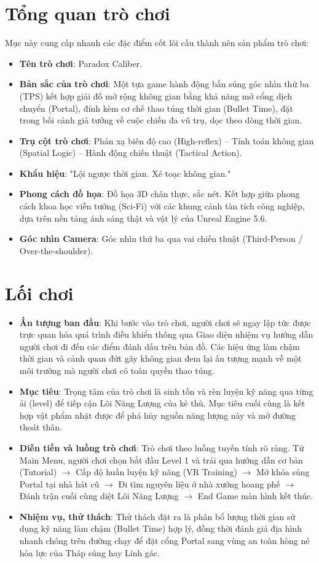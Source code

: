 \documentclass[../DoAn.tex]{subfiles}
\begin{document}
\section{Tổng quan trò chơi}
Mục này cung cấp nhanh các đặc điểm cốt lõi cấu thành nên sản phẩm trò chơi:
\begin{itemize}
    \item \textbf{Tên trò chơi}: Paradox Caliber.
    \item \textbf{Bản sắc của trò chơi}: Một tựa game hành động bắn súng góc nhìn thứ ba (TPS) kết hợp giải đố mở rộng không gian bằng khả năng mở cổng dịch chuyển (Portal), đính kèm cơ chế thao túng thời gian (Bullet Time), đặt trong bối cảnh giả tưởng về cuộc chiến đa vũ trụ, dọc theo dòng thời gian.
    \item \textbf{Trụ cột trò chơi}: Phản xạ biên độ cao (High-reflex) -- Tính toán không gian (Spatial Logic) -- Hành động chiến thuật (Tactical Action).
    \item \textbf{Khẩu hiệu}: "Lội ngược thời gian. Xé toạc không gian."
    \item \textbf{Phong cách đồ họa}: Đồ họa 3D chân thực, sắc nét. Kết hợp giữa phong cách khoa học viễn tưởng (Sci-Fi) với các khung cảnh tàn tích công nghiệp, dựa trên nền tảng ánh sáng thật và vật lý của Unreal Engine 5.6.
    \item \textbf{Góc nhìn Camera}: Góc nhìn thứ ba qua vai chiến thuật (Third-Person / Over-the-shoulder).
\end{itemize}

\section{Lối chơi}
\begin{itemize}
    \item \textbf{Ấn tượng ban đầu}: Khi bước vào trò chơi, người chơi sẽ ngay lập tức được trực quan hóa quá trình điều khiển thông qua Giao diện nhiệm vụ hướng dẫn người chơi đi đến các điểm đánh dấu trên bản đồ. Các hiệu ứng làm chậm thời gian và cảnh quan đứt gãy không gian đem lại ấn tượng mạnh về một môi trường mà người chơi có toàn quyền thao túng.
    \item \textbf{Mục tiêu}: Trọng tâm của trò chơi là sinh tồn và rèn luyện kỹ năng qua từng ải (level) để tiếp cận Lõi Năng Lượng của kẻ thù. Mục tiêu cuối cùng là kết hợp vật phẩm nhặt được để phá hủy nguồn năng lượng này và mở đường thoát thân.
    \item \textbf{Diễn tiến và luồng trò chơi}: Trò chơi theo luồng tuyến tính rõ ràng. Từ Main Menu, người chơi chọn bắt đầu Level 1 và trải qua hướng dẫn cơ bản (Tutorial) \(\rightarrow\) Cấp độ huấn luyện kỹ năng (VR Training) \(\rightarrow\) Mở khóa súng Portal tại nhà hát cũ \(\rightarrow\) Đi tìm nguyên liệu ở nhà xưởng hoang phế \(\rightarrow\) Đánh trận cuối cùng diệt Lõi Năng Lượng \(\rightarrow\) End Game màn hình kết thúc.
    \item \textbf{Nhiệm vụ, thử thách}: Thử thách đặt ra là phân bổ lượng thời gian sử dụng kỹ năng làm chậm (Bullet Time) hợp lý, đồng thời đánh giá địa hình nhanh chóng trên đường chạy để đặt cổng Portal sang vùng an toàn hòng né hỏa lực của Tháp súng hay Lính gác.
\end{itemize}
\end{document}
